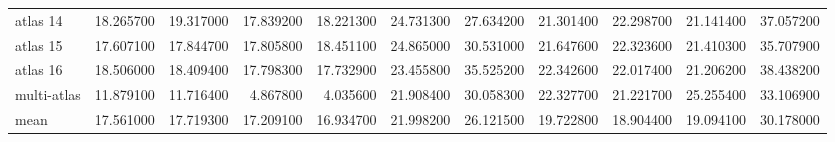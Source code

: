 \documentclass[a4paper]{article}
\begin{document}
\begin{landscape}
\begin{tabular}{lrrrrrrrrrr}
atlas 14 & 18.265700 & 19.317000 & 17.839200 & 18.221300 & 24.731300 & 27.634200 & 21.301400 & 22.298700 & 21.141400 & 37.057200 \\
atlas 15 & 17.607100 & 17.844700 & 17.805800 & 18.451100 & 24.865000 & 30.531000 & 21.647600 & 22.323600 & 21.410300 & 35.707900 \\
atlas 16 & 18.506000 & 18.409400 & 17.798300 & 17.732900 & 23.455800 & 35.525200 & 22.342600 & 22.017400 & 21.206200 & 38.438200 \\
multi-atlas & 11.879100 & 11.716400 & 4.867800 & 4.035600 & 21.908400 & 30.058300 & 22.327700 & 21.221700 & 25.255400 & 33.106900 \\
mean & 17.561000 & 17.719300 & 17.209100 & 16.934700 & 21.998200 & 26.121500 & 19.722800 & 18.904400 & 19.094100 & 30.178000 \\
\bottomrule
\end{tabular}

\end{landscape}
\end{document}
